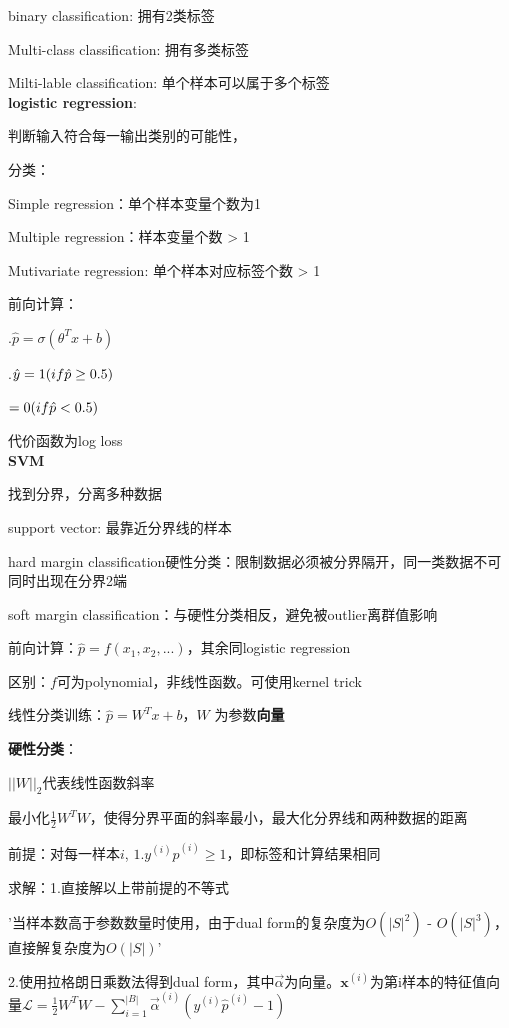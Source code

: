 \documentclass[UTF8]{ctexart}
\begin{document}
  binary classification: 拥有2类标签

  Multi-class classification: 拥有多类标签

  Milti-lable classification: 单个样本可以属于多个标签\\
\textbf{logistic regression}:

  判断输入符合每一输出类别的可能性，

  分类：

  \quad Simple regression：单个样本变量个数为1

  \quad Multiple regression：样本变量个数 > 1

  \quad Mutivariate regression: 单个样本对应标签个数 > 1

  前向计算：
  
  .$\hat{p} = \sigma(\theta^Tx + b)$

  .$\hat{y} = 1\space (if \hat{p} \geq 0.5)$

  \quad \quad \quad $= 0\space (if \hat{p} < 0.5)$

  代价函数为log loss\\
\textbf{SVM}

  找到分界，分离多种数据

  support vector: 最靠近分界线的样本

  hard margin classification硬性分类：限制数据必须被分界隔开，同一类数据不可同时出现在分界2端

  soft margin classification：与硬性分类相反，避免被outlier离群值影响

  前向计算：$\hat{p} = f(x_1, x_2,...)$，其余同logistic regression

  \quad 区别：$f$可为polynomial，非线性函数。可使用kernel trick

  线性分类训练：$\hat{p} = W^Tx + b$，$W$ 为参数\textbf{向量}

  \quad \textbf{硬性分类}：

  \quad \quad $||W||_2$代表线性函数斜率

  \quad \quad 最小化$\frac{1}{2}W^TW$，使得分界平面的斜率最小，最大化分界线和两种数据的距离

  \quad \quad 前提：对每一样本$i$, $1.y^{(i)}\hat{p}^{(i)} \geq 1$，即标签和计算结果相同

  \quad \quad 求解：1.直接解以上带前提的不等式

  \quad \quad \quad '当样本数高于参数数量时使用，由于dual form的复杂度为$O(|S|^2)$ - $O(|S|^3)$，直接解复杂度为$O(|S|)$'
  
  \quad \quad 2.使用拉格朗日乘数法得到dual form，其中$\vec{\alpha}$为向量。$\textbf{x}^{(i)}$为第i样本的特征值向量$\mathcal{L} = \frac{1}{2}W^TW - \sum_{i=1}^{|B|}\vec{\alpha}^{(i)}(y^{(i)}\hat{p}^{(i)} - 1)$
\end{document}
